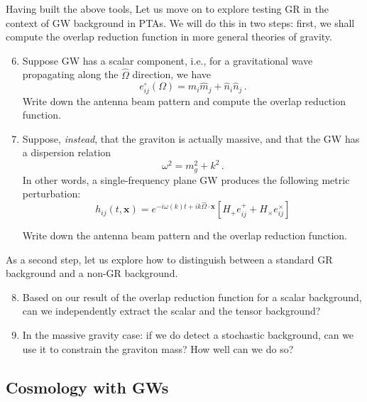 \documentclass[article, onecolumn, ,nofootinbib,nopreprintnumbers]{revtex4}
\begin{document}
Having built the above tools, Let us move on to explore testing GR in the context of GW background in PTAs.  We will do this in two steps: first, we shall compute the overlap reduction function in more general theories of gravity.  
\begin{enumerate}
\setcounter{enumi}{5}
\item Suppose GW has a scalar component, i.e., for a gravitational wave propagating along the $\hat\Omega$ direction, we have 
\begin{equation}
e^{\circ}_{ij}(\Omega)=\hat m_i\hat m_j+\hat n_i \hat n_j\,.
\end{equation}
Write down the antenna beam pattern and compute the overlap reduction function.  
\item Suppose, {\it instead}, that the graviton is actually massive, and that the GW has a dispersion relation 
\begin{equation}
\omega^2 = m_g^2 +k^2\,.
\end{equation}
In other words, a single-frequency plane GW produces the following metric perturbation: 
\begin{equation}
h_{ij} (t,\mathbf{x}) = e^{-i\omega(k) t+ i k\hat\Omega\cdot\mathbf{x}} \left[
H_+ e^{+}_{ij} +
H_\times e^{\times}_{ij}\right]
\end{equation}

Write down the antenna beam pattern and the overlap reduction function. 
\end{enumerate}
As a second step, let us explore how to distinguish between a standard GR background and a non-GR background. 
\begin{enumerate}
\setcounter{enumi}{7}
\item Based on our result of the overlap reduction function for a scalar background, can we independently extract the scalar and the tensor background?  
\item In the massive gravity case: if we do detect a stochastic background, can we use it to constrain the graviton mass?  How well can we do so?
\end{enumerate}

\subsection{Cosmology with GWs}
\end{document}

